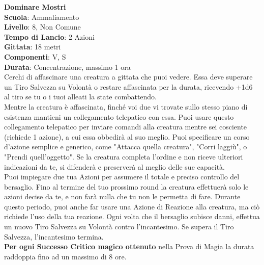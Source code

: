 \begin{multicols}{2}
\medskip\textbf{Dominare Mostri}\\
\textbf{Scuola}: Ammaliamento\\
\textbf{Livello}: 8, Non Comune\\
\textbf{Tempo di Lancio}: 2 Azioni\\
\textbf{Gittata}: 18 metri\\
\textbf{Componenti}: V, S\\
\textbf{Durata}: Concentrazione, massimo 1 ora\\
Cerchi di affascinare una creatura a gittata che puoi vedere. Essa deve superare un Tiro Salvezza su Volontà o restare affascinata per la durata, ricevendo +1d6 al tiro se tu o i tuoi alleati la state combattendo.\\
Mentre la creatura è affascinata, finché voi due vi trovate sullo stesso piano di esistenza mantieni un collegamento telepatico con essa. Puoi usare questo collegamento telepatico per inviare comandi alla creatura mentre sei cosciente (richiede 1 azione), a cui essa obbedirà al suo meglio. Puoi specificare un corso d'azione semplice e generico, come "Attacca quella creatura", "Corri laggiù", o "Prendi quell'oggetto". Se la creatura completa l'ordine e non riceve ulteriori indicazioni da te, si difenderà e preserverà al meglio delle sue capacità.\\
Puoi impiegare due tua Azioni per assumere il totale e preciso controllo del bersaglio. Fino al termine del tuo prossimo round la creatura effettuerà solo le azioni decise da te, e non farà nulla che tu non le permetta di fare. Durante questo periodo, puoi anche far usare una Azione di Reazione alla creatura, ma ciò richiede l'uso della tua reazione. Ogni volta che il bersaglio subisce danni, effettua un nuovo Tiro Salvezza su Volontà contro l'incantesimo. Se supera il Tiro Salvezza, l'incantesimo termina.\\
\textbf{Per ogni Successo Critico magico ottenuto} nella Prova di Magia la durata raddoppia fino ad un massimo di 8 ore.


\end{multicols}
